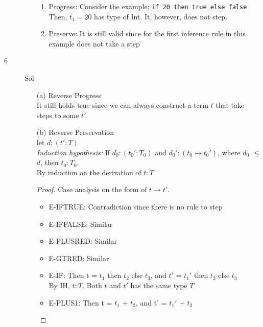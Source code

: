 \documentclass{article}
\begin{document}
\begin{description}
\begin{enumerate}
                \begin{enumerate}
                        \item Progress: Consider the example: \verb|if 20 then true else false |\\ Then, $t_1 = 20 $ has type of Int.
                        It, however, does not step.
                        \item Preserve: It is still valid since for the first inference rule in this example does not take a step
                    \end{enumerate}

            \end{enumerate}
        \item[6]{Sol}
            \begin{enumerate}
                \item[(a)]{Reverse Progress}\\
                    It still holds true since we can always construct a term $t$ that take steps to some $t'$
                \item[(b)]{Reverse Preservation}\\
                    let $d:(t':T)$\\
                    \textit{Induction hypothesis:} If $d_0:(t_0':T_0)$ and $d_0':(t_0 \rightarrow t_0')$, where $d_0$ $\leq$ $d$, then $t_0:T_0$.\\
                    By induction on the derivation of $t:T$
                    \begin{proof}
                        Case analysis on the form of $t \rightarrow t'$.
                        \begin{itemize}
                            \item E-IFTRUE: Contradiction since there is no rule to step
                            \item E-IFFALSE: Similar
                            \item E-PLUSRED: Similar
                            \item E-GTRED: Similar
                            \item E-IF: Then t = $t_1$ then $t_2$ else $t_3$, and $t'$ = $t_1'$ then $t_2$ else $t_3$\\
                                By IH, $t:T$. Both $t$ and $t'$ has the same type $T$
                            \item E-PLUS1: Then t = $t_1$ + $t_2$, and t' = $t_1'$ + $t_2$\\

\end{itemize}
\end{proof}
\end{enumerate}
\end{description}
\end{document}
